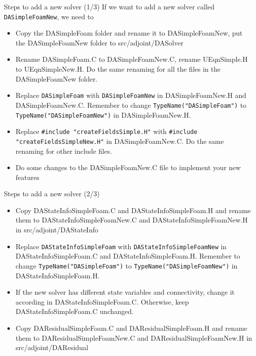 \documentclass{bredelebeamer}
\begin{document}
\begin{frame}[fragile]{Steps to add a new solver (1/3)}
If we want to add a new solver called \texttt{DASimpleFoamNew}, we need to
\begin{itemize}
  \setlength\itemsep{0.5em}
 \item Copy the DASimpleFoam folder and rename it to DASimpleFoamNew, put the DASimpleFoamNew folder to src/adjoint/DASolver
 \item Rename DASimpleFoam.C to DASimpleFoamNew.C, rename UEqnSimple.H to UEqnSimpleNew.H. Do the same renaming for all the files in the DASimpleFoamNew folder.
 \item Replace \texttt{DASimpleFoam} with \texttt{DASimpleFoamNew} in DASimpleFoamNew.H and DASimpleFoamNew.C. Remember to change \texttt{TypeName("DASimpleFoam")} to \texttt{TypeName("DASimpleFoamNew")} in DASimpleFoamNew.H.
 \item Replace \texttt{\#include "createFieldsSimple.H"} with \texttt{\#include "createFieldsSimpleNew.H"} in DASimpleFoamNew.C. Do the same renaming for other include files.
 \item Do some changes to the DASimpleFoamNew.C file to implement your new features
\end{itemize}
\end{frame}

\begin{frame}[fragile]{Steps to add a new solver (2/3)}
\begin{itemize}
  \setlength\itemsep{0.5em}
 \item Copy DAStateInfoSimpleFoam.C and DAStateInfoSimpleFoam.H and rename them to DAStateInfoSimpleFoamNew.C and DAStateInfoSimpleFoamNew.H in src/adjoint/DAStateInfo
 \item Replace \texttt{DAStateInfoSimpleFoam} with \texttt{DAStateInfoSimpleFoamNew} in DAStateInfoSimpleFoam.C and DAStateInfoSimpleFoam.H. Remember to change \texttt{TypeName("DASimpleFoam")} to \texttt{TypeName("DASimpleFoamNew")} in DAStateInfoSimpleFoam.H.
 \item If the new solver has different state variables and connectivity, change it according in DAStateInfoSimpleFoam.C. Otherwise, keep DAStateInfoSimpleFoam.C unchanged.
 \item Copy DAResidualSimpleFoam.C and DAResidualSimpleFoam.H and rename them to DAResidualSimpleFoamNew.C and DAResidualSimpleFoamNew.H in src/adjoint/DAResidual
 
\end{itemize}
\end{frame}
\end{document}
